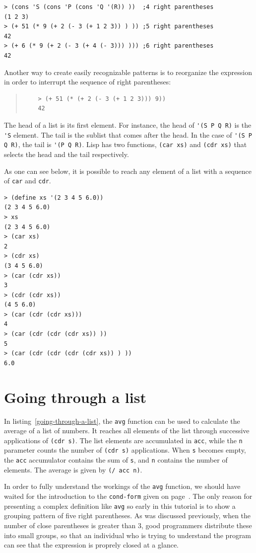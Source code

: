 \documentclass[a4paper,12pt]{book}
\begin{document}
\begin{verbatim}
> (cons 'S (cons 'P (cons 'Q '(R)) ))  ;4 right parentheses
(1 2 3)
> (+ 51 (* 9 (+ 2 (- 3 (+ 1 2 3)) ) )) ;5 right parentheses
42 
> (+ 6 (* 9 (+ 2 (- 3 (+ 4 (- 3))) ))) ;6 right parentheses
42
\end{verbatim}

Another way to create easily recognizable patterns  is to
reorganize the expression in order to interrupt the sequence
of right parentheses:
\begin{quote}
	\begin{verbatim}
	> (+ 51 (* (+ 2 (- 3 (+ 1 2 3))) 9))
	42
	\end{verbatim}
\end{quote}

The head of a list is its first element. For instance, the head of
\verb|'(S P Q R)| is the \verb|'S| element. The tail is the sublist
that comes after the head. In the case of \verb|'(S P Q R)|, the tail
is \verb|'(P Q R)|. Lisp has two functions, \verb|(car xs)| and
\verb|(cdr xs)| that selects the head and the tail respectively.

As one can see below, it is possible to reach any element of a list
with a sequence of \verb|car| and \verb|cdr|.
\begin{verbatim}
> (define xs '(2 3 4 5 6.0))
(2 3 4 5 6.0)
> xs
(2 3 4 5 6.0)
> (car xs)
2
> (cdr xs)
(3 4 5 6.0)
> (car (cdr xs))
3
> (cdr (cdr xs))
(4 5 6.0)
> (car (cdr (cdr xs)))
4
> (car (cdr (cdr (cdr xs)) ))
5
> (car (cdr (cdr (cdr (cdr xs)) ) ))
6.0
\end{verbatim}

\section{Going through a list}\label{sec:average}
In listing~\ref{going-through-a-list},
the \verb|avg| function can be used to
calculate the average of a list of numbers.
It reaches all elements of the list
through successive applications
of  \verb|(cdr s)|.
The list elements are accumulated in
\verb|acc|,
while the \verb|n| parameter counts
the number of \verb|(cdr s)| applications.
When  \verb|s| becomes empty, the \verb|acc|
accumulator contains the sum of \verb|s|, and \verb|n|
contains the number of elements. The average
is given by \verb|(/ acc n)|. 

In order to fully understand the workings
of the \verb|avg| function, we should have
waited for the introduction to the \verb|cond-form|
given on page~\pageref{page:cond-form}.
The only reason for presenting
a complex definition like \verb|avg|
so early in this tutorial is
to show a grouping pattern of five
right parentheses. As was discussed
previously, when the number of close
parentheses is greater than 3, good
programmers distribute these into small
groups, so that an individual who is
trying to understand the program
can see that the expression is
proprely closed at a glance.
\end{document}
